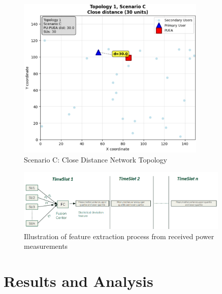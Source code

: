 \documentclass[pdflatex,sn-mathphys-num]{sn-jnl}%
\theoremstyle{thmstyleone}
\theoremstyle{thmstyletwo}
\theoremstyle{thmstylethree}
\begin{document}
\begin{figure}[!t]
\centering
\includegraphics[width=0.8\textwidth]{figures/scenario C system model.png}
\caption{Scenario C: Close Distance Network Topology}
\label{fig:scenario_C}
\end{figure}

\begin{figure}[!t]
\centering
\includegraphics[width=0.9\textwidth]{figures/FEX.png}
\caption{Illustration of feature extraction process from received power measurements}
\label{fig:feature_extraction}
\end{figure}

\section{Results and Analysis}\label{sec6}
\end{document}

